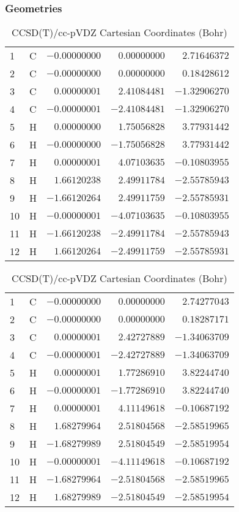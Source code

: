 \documentclass[10pt,oneside]{article}
\begin{document}
\begin{table}[h!]
\subsubsection*{Geometries}
\begin{multicols}{2}
\centering
\caption{CCSD(T)/cc-pVTZ Cartesian Coordinates (Bohr)}
\begin{tabular}{llrrr}
\toprule
1  & C  & $-0.00000000$ & $ 0.00000000$ & $ 2.71646372$ \\
2  & C  & $-0.00000000$ & $ 0.00000000$ & $ 0.18428612$ \\
3  & C  & $ 0.00000001$ & $ 2.41084481$ & $-1.32906270$ \\
4  & C  & $-0.00000001$ & $-2.41084481$ & $-1.32906270$ \\
5  & H  & $ 0.00000000$ & $ 1.75056828$ & $ 3.77931442$ \\
6  & H  & $-0.00000000$ & $-1.75056828$ & $ 3.77931442$ \\
7  & H  & $ 0.00000001$ & $ 4.07103635$ & $-0.10803955$ \\
8  & H  & $ 1.66120238$ & $ 2.49911784$ & $-2.55785943$ \\
9  & H  & $-1.66120264$ & $ 2.49911759$ & $-2.55785931$ \\
10 & H  & $-0.00000001$ & $-4.07103635$ & $-0.10803955$ \\
11 & H  & $-1.66120238$ & $-2.49911784$ & $-2.55785943$ \\
12 & H  & $ 1.66120264$ & $-2.49911759$ & $-2.55785931$ \\
\bottomrule
\end{tabular}
\caption{CCSD(T)/cc-pVDZ Cartesian Coordinates (Bohr)}
\begin{tabular}{llrrr}
\toprule
1  & C  & $-0.00000000$ & $ 0.00000000$ & $ 2.74277043$ \\
2  & C  & $-0.00000000$ & $ 0.00000000$ & $ 0.18287171$ \\
3  & C  & $ 0.00000001$ & $ 2.42727889$ & $-1.34063709$ \\
4  & C  & $-0.00000001$ & $-2.42727889$ & $-1.34063709$ \\
5  & H  & $ 0.00000001$ & $ 1.77286910$ & $ 3.82244740$ \\
6  & H  & $-0.00000001$ & $-1.77286910$ & $ 3.82244740$ \\
7  & H  & $ 0.00000001$ & $ 4.11149618$ & $-0.10687192$ \\
8  & H  & $ 1.68279964$ & $ 2.51804568$ & $-2.58519965$ \\
9  & H  & $-1.68279989$ & $ 2.51804549$ & $-2.58519954$ \\
10 & H  & $-0.00000001$ & $-4.11149618$ & $-0.10687192$ \\
11 & H  & $-1.68279964$ & $-2.51804568$ & $-2.58519965$ \\
12 & H  & $ 1.68279989$ & $-2.51804549$ & $-2.58519954$ \\
\bottomrule
\end{tabular}
\end{multicols}
\end{table}
\end{document}
